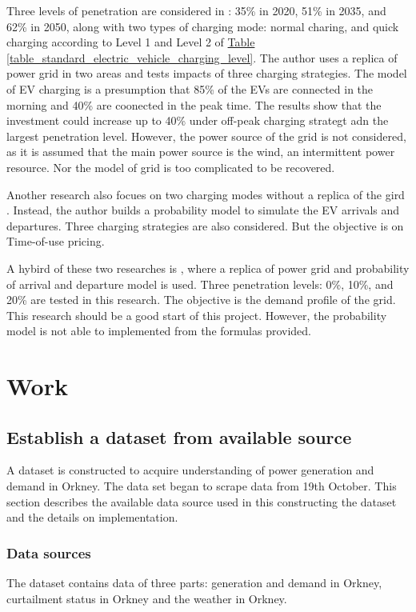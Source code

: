 \documentclass[12pt,a4paper]{report}
\begin{document}
        Three levels of penetration are considered in \cite{paper:PieltainFernandez2011}: 35\% in 2020, 51\% in 2035, and 62\% in 2050, along with two types of charging mode: normal charing, and quick charging according to Level 1 and Level 2 of \hyperref[table_standard_electric_vehicle_charging_level]{Table \ref*{table_standard_electric_vehicle_charging_level}}. The author uses a replica of power grid in two areas and tests impacts of three charging strategies. The model of EV charging is a presumption that 85\% of the EVs are connected in the morning and 40\% are coonected in the peak time. The results show that the investment could increase up to 40\% under off-peak charging strategt adn the largest penetration level. However, the power source of the grid is not considered, as it is assumed that the main power source is the wind, an intermittent power resource. Nor the model of grid is too complicated to be recovered.

        Another research also focues on two charging modes without a replica of the gird \cite{paper:Shao2010}. Instead, the author builds a probability model to simulate the EV arrivals and departures. Three charging strategies are also considered. But the objective is on Time-of-use pricing.

        A hybird of these two researches is \cite{paper:Qian2011}, where a replica of power grid and probability of arrival and departure model is used. Three penetration levels: 0\%, 10\%, and 20\% are tested in this research. The objective is the demand profile of the grid. This research should be a good start of this project. However, the probability model is not able to implemented from the formulas provided.
        
    \chapter{Work}
        \section{Establish a dataset from available source}
        A dataset is constructed to acquire understanding of power generation and demand in Orkney. The data set began to scrape data from 19th October. 
        This section describes the available data source used in this constructing the dataset and the details on implementation.

        \subsection{Data sources}
        The dataset contains data of three parts: generation and demand in Orkney, curtailment status in Orkney and the weather in Orkney.
\end{document}
